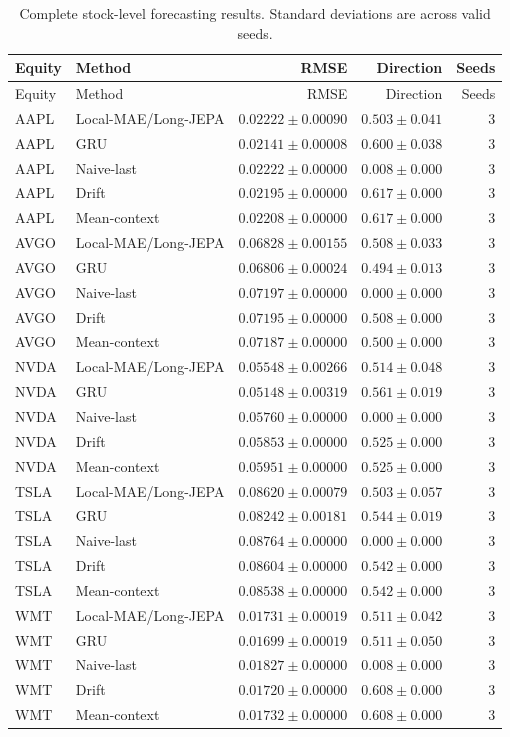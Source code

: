 \begin{longtable}{llrrr}
\caption{Complete stock-level forecasting results. Standard deviations are across valid seeds.}\label{tab:appendix_stock_metrics}\\
\toprule
Equity & Method & RMSE & Direction & Seeds \\
\midrule
\endfirsthead
\toprule
Equity & Method & RMSE & Direction & Seeds \\
\midrule
\endhead
AAPL & Local-MAE/Long-JEPA & $0.02222 \pm 0.00090$ & $0.503 \pm 0.041$ & 3 \\
AAPL & GRU & $0.02141 \pm 0.00008$ & $0.600 \pm 0.038$ & 3 \\
AAPL & Naive-last & $0.02222 \pm 0.00000$ & $0.008 \pm 0.000$ & 3 \\
AAPL & Drift & $0.02195 \pm 0.00000$ & $0.617 \pm 0.000$ & 3 \\
AAPL & Mean-context & $0.02208 \pm 0.00000$ & $0.617 \pm 0.000$ & 3 \\
AVGO & Local-MAE/Long-JEPA & $0.06828 \pm 0.00155$ & $0.508 \pm 0.033$ & 3 \\
AVGO & GRU & $0.06806 \pm 0.00024$ & $0.494 \pm 0.013$ & 3 \\
AVGO & Naive-last & $0.07197 \pm 0.00000$ & $0.000 \pm 0.000$ & 3 \\
AVGO & Drift & $0.07195 \pm 0.00000$ & $0.508 \pm 0.000$ & 3 \\
AVGO & Mean-context & $0.07187 \pm 0.00000$ & $0.500 \pm 0.000$ & 3 \\
NVDA & Local-MAE/Long-JEPA & $0.05548 \pm 0.00266$ & $0.514 \pm 0.048$ & 3 \\
NVDA & GRU & $0.05148 \pm 0.00319$ & $0.561 \pm 0.019$ & 3 \\
NVDA & Naive-last & $0.05760 \pm 0.00000$ & $0.000 \pm 0.000$ & 3 \\
NVDA & Drift & $0.05853 \pm 0.00000$ & $0.525 \pm 0.000$ & 3 \\
NVDA & Mean-context & $0.05951 \pm 0.00000$ & $0.525 \pm 0.000$ & 3 \\
TSLA & Local-MAE/Long-JEPA & $0.08620 \pm 0.00079$ & $0.503 \pm 0.057$ & 3 \\
TSLA & GRU & $0.08242 \pm 0.00181$ & $0.544 \pm 0.019$ & 3 \\
TSLA & Naive-last & $0.08764 \pm 0.00000$ & $0.000 \pm 0.000$ & 3 \\
TSLA & Drift & $0.08604 \pm 0.00000$ & $0.542 \pm 0.000$ & 3 \\
TSLA & Mean-context & $0.08538 \pm 0.00000$ & $0.542 \pm 0.000$ & 3 \\
WMT & Local-MAE/Long-JEPA & $0.01731 \pm 0.00019$ & $0.511 \pm 0.042$ & 3 \\
WMT & GRU & $0.01699 \pm 0.00019$ & $0.511 \pm 0.050$ & 3 \\
WMT & Naive-last & $0.01827 \pm 0.00000$ & $0.008 \pm 0.000$ & 3 \\
WMT & Drift & $0.01720 \pm 0.00000$ & $0.608 \pm 0.000$ & 3 \\
WMT & Mean-context & $0.01732 \pm 0.00000$ & $0.608 \pm 0.000$ & 3 \\
\bottomrule
\end{longtable}
